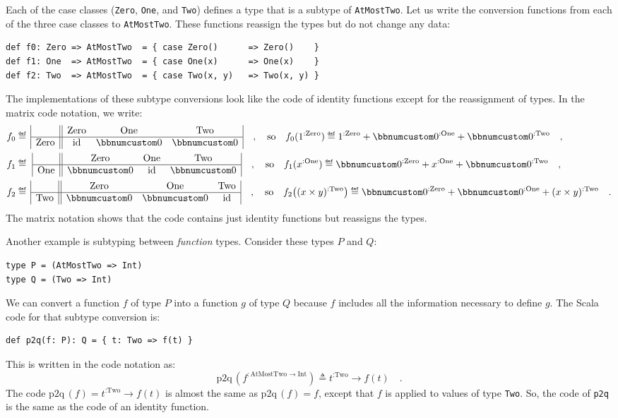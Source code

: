 \noindent Each of the case classes (\lstinline!Zero!, \lstinline!One!,
and \lstinline!Two!) defines a type that is a subtype of \lstinline!AtMostTwo!.
Let us write the conversion functions from each of the three case
classes to \lstinline!AtMostTwo!. These functions reassign the types
but do not change any data:
\begin{lstlisting}
def f0: Zero => AtMostTwo  = { case Zero()      => Zero()    }
def f1: One  => AtMostTwo  = { case One(x)      => One(x)    }
def f2: Two  => AtMostTwo  = { case Two(x, y)   => Two(x, y) }
\end{lstlisting}
The implementations of these subtype conversions look like the code
of identity functions except for the reassignment of types. In the
matrix code notation, we write:
\begin{align*}
f_{0} & \triangleq\,\begin{array}{|c||ccc|}
 & \text{Zero} & \text{One} & \text{Two}\\
\hline \text{Zero} & \text{id} & \bbnum 0 & \bbnum 0
\end{array}\quad,\quad\text{so}\quad f_{0}(1^{:\text{Zero}})\triangleq1^{:\text{Zero}}+\bbnum 0^{:\text{One}}+\bbnum 0^{:\text{Two}}\quad,\\
f_{1} & \triangleq\,\,\begin{array}{|c||ccc|}
 & \text{Zero} & \text{One} & \text{Two}\\
\hline \text{One} & \bbnum 0 & \text{id} & \bbnum 0
\end{array}\quad,\quad\text{so}\quad f_{1}(x^{:\text{One}})\triangleq\bbnum 0^{:\text{Zero}}+x^{:\text{One}}+\bbnum 0^{:\text{Two}}\quad,\\
f_{2} & \triangleq\,\begin{array}{|c||ccc|}
 & \text{Zero} & \text{One} & \text{Two}\\
\hline \text{Two} & \bbnum 0 & \bbnum 0 & \text{id}
\end{array}\quad,\quad\text{so}\quad f_{2}\big((x\times y)^{:\text{Two}}\big)\triangleq\bbnum 0^{:\text{Zero}}+\bbnum 0^{:\text{One}}+(x\times y)^{:\text{Two}}\quad.
\end{align*}
The matrix notation shows that the code contains just identity functions
but reassigns the types.

Another example is  subtyping between \emph{function} types. Consider
these types $P$ and $Q$:
\begin{lstlisting}
type P = (AtMostTwo => Int)
type Q = (Two => Int)
\end{lstlisting}
We can convert a function $f$ of type $P$ into a function $g$ of
type $Q$ because $f$ includes all the information necessary to define
$g$. The Scala code for that subtype conversion is:
\begin{lstlisting}
def p2q(f: P): Q = { t: Two => f(t) }
\end{lstlisting}
This is written in the code notation as:
\[
\text{p2q}\,(f^{:\text{AtMostTwo}\rightarrow\text{Int}})\triangleq t^{:\text{Two}}\rightarrow f(t)\quad.
\]
The code $\text{p2q}\,(f)=t^{:\text{Two}}\rightarrow f(t)$ is almost
the same as $\text{p2q}\,(f)=f$, except that $f$ is applied to values
of type \lstinline!Two!. So, the code of \lstinline!p2q! is the
same as the code of an identity function.

